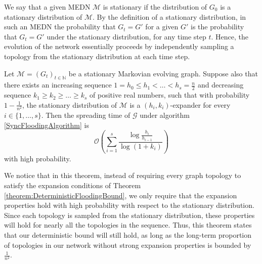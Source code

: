 We say that a given MEDN $\mathcal{M}$ is stationary if the distribution of $G_0$ is a stationary distribution of $\mathcal{M}$. By the definition of a stationary distribution, in such an MEDN the probability that $G_t = G'$ for a given $G'$ is the probability that $G_t = G'$ under the stationary distribution, for any time step $t$. Hence, the evolution of the network essentially proceeds by independently sampling a topology from the stationary distribution at each time step. %


\begin{theorem}
	Let $\mathcal{M} = (G_t)_{t \in \mathbb{N}}$  be a stationary Markovian evolving graph. Suppose also that there exists an increasing sequence $1 = h_0 \leq h_1 < \dots < h_s = \frac{n}{2}$ and decreasing sequence $k_1 \geq k_2 \geq \dots \geq k_s$ of positive real numbers, such that with probability $1-\frac{1}{n^2}$, the stationary distribution of $\mathcal{M}$ is a $(h_i, k_i)$-expander for every $i \in \{1, \dots , s\}$. Then the spreading time of $\mathcal{G}$ under algorithm \ref{SyncFloodingAlgorithm} is
	$$
		\mathcal{O}\left(\sum_{i=1}^s \frac{\log \frac{h_i}{h_{i-1}}}{\log(1+k_i)}\right)
	$$
	with high probability.
\end{theorem}

We notice that in this theorem, instead of requiring every graph topology to satisfy the expansion conditions of Theorem \ref{theorem:DeterministicFloodingBound}, we only require that the expansion properties hold with high probability with respect to the stationary distribution. Since each topology is sampled from the stationary distribution, these properties will hold for nearly all the topologies in the sequence. Thus, this theorem states that our deterministic bound will still hold, as long as the long-term proportion of topologies in our network without strong expansion properties is bounded by $\frac{1}{n^2}$.


